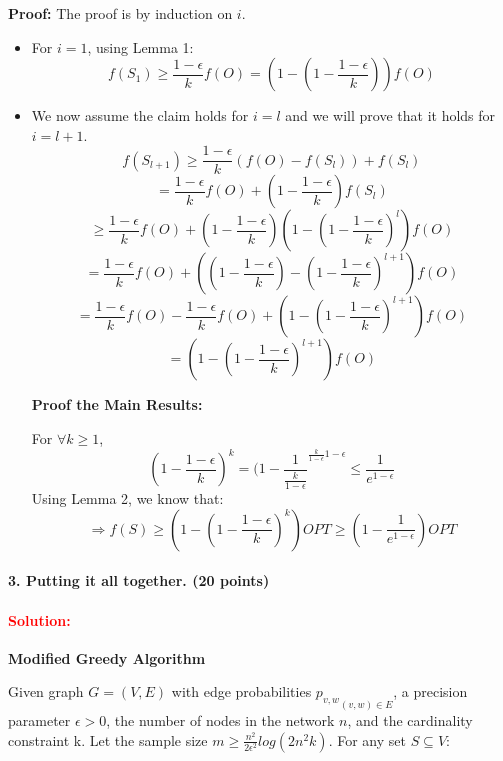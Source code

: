 \documentclass[11pt]{article} %
\begin{document}
\begin{itemize}
\textbf{Proof:}
The proof is by induction on $i$. 
\begin{itemize}	
	\item For $i=1$, using Lemma 1: $$ f(S_1) \ge \frac{1-\epsilon}{k} f(O) =(1-(1-\frac{1-\epsilon}{k})) f(O)$$ 
	\item We now assume the claim holds for $i=l$ and we will prove that it holds for $i=l+1$. 
	$$ f(S_{l+1}) \ge  \frac{1-\epsilon}{k} (f(O)-f(S_l)) +  f(S_l)$$ 
 	$$ = \frac{1-\epsilon}{k} f(O) +( 1- \frac{1-\epsilon}{k}) f(S_l) $$ 
	$$ \ge \frac{1-\epsilon}{k} f(O) + ( 1- \frac{1-\epsilon}{k})(1-{(1-\frac{1-\epsilon}{k})}^l)f(O)  $$
	$$ = \frac{1-\epsilon}{k} f(O) + ( ( 1- \frac{1-\epsilon}{k}) -{(1-\frac{1-\epsilon}{k})}^{l+1})f(O)  $$
	$$ = \frac{1-\epsilon}{k} f(O) -\frac{1-\epsilon}{k} f(O)+  (1-{(1-\frac{1-\epsilon}{k})}^{l+1})f(O)   $$
	$$ =(1-{(1-\frac{1-\epsilon}{k})}^{l+1})f(O)   $$

\textbf{Proof the Main Results:}

For $\forall k \ge 1$, 
$$ (1-\frac{1-\epsilon}{k})^k = (1-\frac{1}{\frac{k}{1-\epsilon}}^{\frac{k}{1-\epsilon} 1-\epsilon} \le \frac{1}{e^{1-\epsilon}}$$ 
Using Lemma 2, we know that:
$$ \Rightarrow f(S) \ge (1-{(1-\frac{1-\epsilon}{k})}^{k})OPT \ge (1-\frac{1}{e^{1-\epsilon}})OPT$$
\end{itemize}
\end{itemize}
	
























\paragraph{3. Putting it all together. (20 points)}  


\paragraph{\textcolor{red}{Solution:}} 
\textbf{Modified Greedy Algorithm}

Given graph $G=(V,E)$ with edge probabilities ${p_{v,w}}_{(v,w) \in E}$, a precision parameter $\epsilon >0$, the number of nodes in the network $n$, and the cardinality constraint k. Let the sample size $m \ge \frac{n^2}{2 \epsilon^2} log(2 n^2 k) $. For any set $S \subseteq V$: \\
\end{document}
